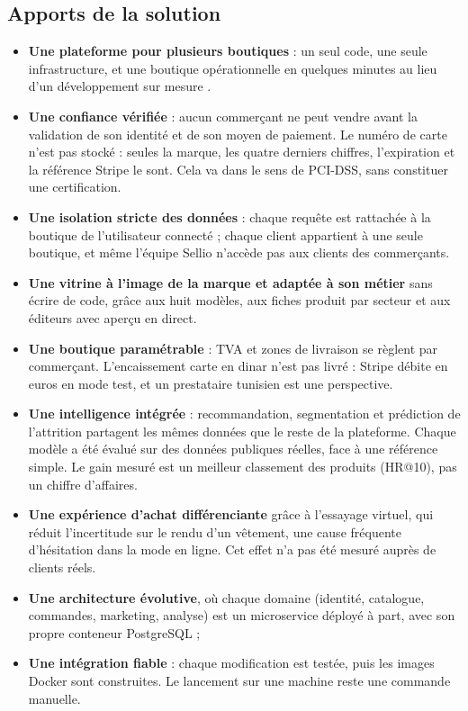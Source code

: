 \subsection{Apports de la solution}
\begin{itemize}
    \item \textbf{Une plateforme pour plusieurs boutiques} : un seul code, une seule infrastructure, et une boutique opérationnelle en quelques minutes au lieu d'un développement sur mesure .
    \item \textbf{Une confiance vérifiée} : aucun commerçant ne peut vendre avant la validation de son identité et de son moyen de paiement. Le numéro de carte n'est pas stocké : seules la marque, les quatre derniers chiffres, l'expiration et la référence Stripe le sont. Cela va dans le sens de PCI-DSS, sans constituer une certification.
    \item \textbf{Une isolation stricte des données} : chaque requête est rattachée à la boutique de l'utilisateur connecté ; chaque client appartient à une seule boutique, et même l'équipe Sellio n'accède pas aux clients des commerçants.
    \item \textbf{Une vitrine à l'image de la marque et adaptée à son métier} sans écrire de code, grâce aux huit modèles, aux fiches produit par secteur et aux éditeurs avec aperçu en direct.
    \item \textbf{Une boutique paramétrable} : TVA et zones de livraison se règlent par commerçant. L'encaissement carte en dinar n'est pas livré : Stripe débite en euros en mode test, et un prestataire tunisien est une perspective.
    \item \textbf{Une intelligence intégrée} : recommandation, segmentation et prédiction de l'attrition partagent les mêmes données que le reste de la plateforme. Chaque modèle a été évalué sur des données publiques réelles, face à une référence simple. Le gain mesuré est un meilleur classement des produits (HR@10), pas un chiffre d'affaires.
    \item \textbf{Une expérience d'achat différenciante} grâce à l'essayage virtuel, qui réduit l'incertitude sur le rendu d'un vêtement, une cause fréquente d'hésitation dans la mode en ligne. Cet effet n'a pas été mesuré auprès de clients réels.
    \item \textbf{Une architecture évolutive}, où chaque domaine (identité, catalogue, commandes, marketing, analyse) est un microservice déployé à part, avec son propre conteneur PostgreSQL ;
    \item \textbf{Une intégration fiable} : chaque modification est testée, puis les images Docker sont construites. Le lancement sur une machine reste une commande manuelle.
\end{itemize}

